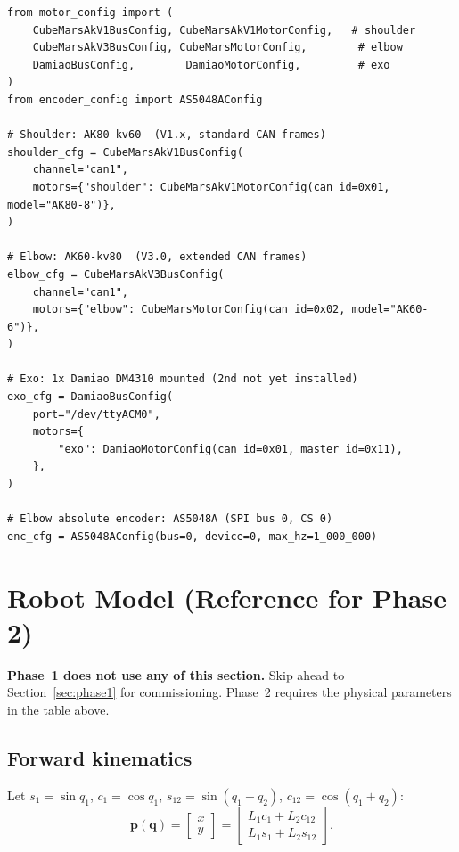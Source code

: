 \documentclass[11pt,a4paper]{article}
\newcommand{\vq}{\bm{q}}
\newcommand{\vp}{\bm{p}}
\begin{document}
\begin{lstlisting}[caption={Bus instantiation using declarative configs (\texttt{src/motor\_config.py}).}]
from motor_config import (
    CubeMarsAkV1BusConfig, CubeMarsAkV1MotorConfig,   # shoulder
    CubeMarsAkV3BusConfig, CubeMarsMotorConfig,        # elbow
    DamiaoBusConfig,        DamiaoMotorConfig,         # exo
)
from encoder_config import AS5048AConfig

# Shoulder: AK80-kv60  (V1.x, standard CAN frames)
shoulder_cfg = CubeMarsAkV1BusConfig(
    channel="can1",
    motors={"shoulder": CubeMarsAkV1MotorConfig(can_id=0x01, model="AK80-8")},
)

# Elbow: AK60-kv80  (V3.0, extended CAN frames)
elbow_cfg = CubeMarsAkV3BusConfig(
    channel="can1",
    motors={"elbow": CubeMarsMotorConfig(can_id=0x02, model="AK60-6")},
)

# Exo: 1x Damiao DM4310 mounted (2nd not yet installed)
exo_cfg = DamiaoBusConfig(
    port="/dev/ttyACM0",
    motors={
        "exo": DamiaoMotorConfig(can_id=0x01, master_id=0x11),
    },
)

# Elbow absolute encoder: AS5048A (SPI bus 0, CS 0)
enc_cfg = AS5048AConfig(bus=0, device=0, max_hz=1_000_000)
\end{lstlisting}

\section{Robot Model (Reference for Phase 2)}
\label{sec:model}

\textbf{Phase~1 does not use any of this section.}
Skip ahead to Section~\ref{sec:phase1} for commissioning.
Phase~2 requires the physical parameters in the table above.

\subsection{Forward kinematics}

Let $s_1{=}\sin q_1$, $c_1{=}\cos q_1$,
$s_{12}{=}\sin(q_1{+}q_2)$, $c_{12}{=}\cos(q_1{+}q_2)$:
\begin{equation}
  \vp(\vq) = \begin{bmatrix} x \\ y \end{bmatrix}
           = \begin{bmatrix}
               L_1 c_1 + L_2 c_{12} \\
               L_1 s_1 + L_2 s_{12}
             \end{bmatrix}.
  \label{eq:fk}
\end{equation}
\end{document}
